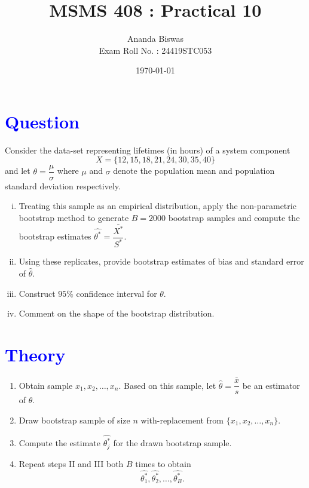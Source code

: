 \documentclass[11pt, a4paper]{article}\usepackage[]{graphicx}\usepackage[]{xcolor}
\title{MSMS 408 : Practical 10}
\author{{\fontsize{22}{20} \benyorithafont Ananda Biswas} \\[1em] Exam Roll No. : 24419STC053}
\date{\today}
\begin{document}
\maketitle


\section*{\faArrowAltCircleRight[regular] \textcolor{blue}{Question}}

\hspace{1cm} Consider the data-set representing lifetimes (in hours) of a system component $$X = \{12, 15, 18, 21, 24, 30, 35, 40\}$$ and let $\theta = \dfrac{\mu}{\sigma}$ where $\mu$ and $\sigma$ denote the population mean and population standard deviation respectively.

\begin{enumerate}[(i)]
\item Treating this sample as an empirical distribution, apply the non-parametric bootstrap method to generate $B = 2000$ bootstrap samples and compute the bootstrap estimates $\widehat{\theta^*} = \dfrac{\bar{X^*}}{S^*}$.

\item Using these replicates, provide bootstrap estimates of bias and standard error of $\widehat{\theta}$.

\item Construct $95\%$ confidence interval for $\theta$.

\item Comment on the shape of the bootstrap distribution.
\end{enumerate}

\section*{\faArrowAltCircleRight[regular] \textcolor{blue}{Theory}}

\begin{enumerate}[Step I.]
\item Obtain sample $x_1, x_2, \ldots, x_n$. Based on this sample, let $\hat{\theta} = \dfrac{\bar{x}}{s}$ be an estimator of $\theta$.

\item Draw bootstrap sample of size $n$ with-replacement from $\{x_1, x_2, \ldots, x_n\}$.

\item Compute the estimate $\widehat{\theta_{j}^{*}}$ for the drawn bootstrap sample.

\item Repeat steps II and III both $B$ times to obtain $$\widehat{\theta_{1}^{*}}, \widehat{\theta_{2}^{*}}, \ldots, \widehat{\theta_{B}^{*}}.$$
\end{enumerate}
\end{document}
